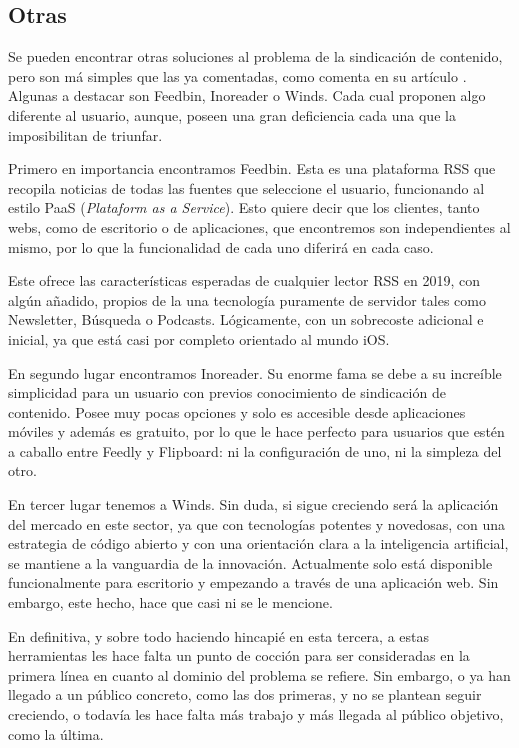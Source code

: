 \subsection{Otras}

Se pueden encontrar otras soluciones al problema de la sindicación de contenido, pero son má simples que las ya comentadas, como comenta en su artículo . Algunas a destacar son Feedbin, Inoreader o Winds. Cada cual proponen algo diferente al usuario, aunque, poseen una gran deficiencia cada una que la imposibilitan de triunfar.

Primero en importancia encontramos Feedbin. Esta es una plataforma RSS que recopila noticias de todas las fuentes que seleccione el usuario, funcionando al estilo PaaS (\textit{Plataform as a Service}). Esto quiere decir que los clientes, tanto webs, como de escritorio o de aplicaciones, que encontremos son independientes al mismo, por lo que la funcionalidad de cada uno diferirá en cada caso.

Este ofrece las características esperadas de cualquier lector RSS en 2019, con algún añadido, propios de la una tecnología puramente de servidor tales como Newsletter, Búsqueda o Podcasts. Lógicamente, con un sobrecoste adicional e inicial, ya que está casi por completo orientado al mundo iOS.

En segundo lugar encontramos Inoreader. Su enorme fama se debe a su increíble simplicidad para un usuario con previos conocimiento de sindicación de contenido. Posee muy pocas opciones y solo es accesible desde aplicaciones móviles y además es gratuito, por lo que le hace perfecto para usuarios que estén a caballo entre Feedly y Flipboard: ni la configuración de uno, ni la simpleza del otro.

En tercer lugar tenemos a Winds. Sin duda, si sigue creciendo será la aplicación del mercado en este sector, ya que con tecnologías potentes y novedosas, con una estrategia de código abierto y con una orientación clara a la inteligencia artificial, se mantiene a la vanguardia de la innovación. Actualmente solo está disponible funcionalmente para escritorio y empezando a través de una aplicación web. Sin embargo, este hecho, hace que casi ni se le mencione.

En definitiva, y sobre todo haciendo hincapié en esta tercera, a estas herramientas les hace falta un punto de cocción para ser consideradas en la primera línea en cuanto al dominio del problema se refiere. Sin embargo, o ya han llegado a un público concreto, como las dos primeras, y no se plantean seguir creciendo, o todavía les hace falta más trabajo y más llegada al público objetivo, como la última.